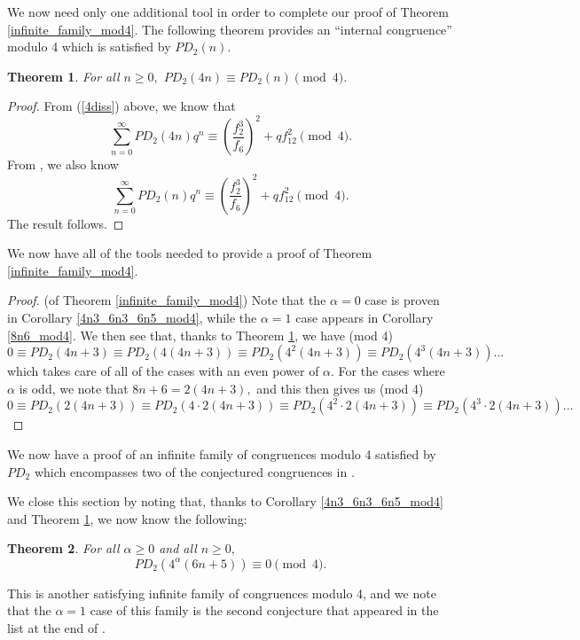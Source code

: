 \documentclass{amsart}
\newtheorem{theorem}{Theorem}[section]
\begin{document}
We now need only one additional tool in order to complete our proof of Theorem \ref{infinite_family_mod4}.  The following theorem provides an ``internal congruence'' modulo 4 which is satisfied by $PD_2(n)$.  

\begin{theorem}
\label{internal_cong_mod4}
For all $n\geq 0,$ $PD_2(4n) \equiv PD_2(n) \pmod{4}.$
\end{theorem}
\begin{proof}
From (\ref{4diss}) above, we know that 
$$\sum_{n=0}^\infty PD_2(4n)q^n \equiv  \left(\frac{f_2^3}{f_6}\right)^2 +qf_{12}^2 \pmod{4}.$$  
From \cite[Lemma 4]{Her}, we also know 
$$\sum_{n=0}^\infty PD_2(n)q^n \equiv  \left(\frac{f_2^3}{f_6}\right)^2 +qf_{12}^2 \pmod{4}.$$  The result follows.  
\end{proof}

We now have all of the tools needed to provide a proof of Theorem \ref{infinite_family_mod4}.  
\begin{proof}
(of Theorem \ref{infinite_family_mod4})  Note that the $\alpha=0$ case is proven in Corollary \ref{4n3_6n3_6n5_mod4}, while the $\alpha = 1$ case appears in Corollary \ref{8n6_mod4}.   We then see that, thanks to Theorem \ref{internal_cong_mod4}, we have (mod 4)
$$
0 \equiv PD_2(4n+3) \equiv PD_2(4(4n+3)) \equiv PD_2(4^2(4n+3)) \equiv PD_2(4^3(4n+3)) \dots
$$
which takes care of all of the cases with an even power of $\alpha.$  For the cases where $\alpha$ is odd, we note that  $8n+6 = 2(4n+3),$ and this then gives us (mod 4) 
$$
0 \equiv PD_2(2(4n+3)) \equiv PD_2(4\cdot 2(4n+3)) \equiv PD_2(4^2\cdot 2(4n+3)) \equiv  PD_2(4^3\cdot 2(4n+3)) \dots
$$
\end{proof}
We now have a proof of an infinite family of congruences modulo 4 satisfied by $PD_2$ which encompasses two of the conjectured congruences in \cite{Her}.  

We close this section by noting that, thanks to Corollary \ref{4n3_6n3_6n5_mod4} and Theorem \ref{internal_cong_mod4}, we now know the following:  
\begin{theorem}
\label{infinite_family_mod4_6n5}
For all $\alpha \geq 0$ and all $n\geq 0,$
$$PD_2(4^\alpha(6n+5)) \equiv 0 \pmod{4}.$$
\end{theorem}
This is another satisfying infinite family of congruences modulo 4, and we note that the $\alpha=1$ case of this family is the second conjecture that appeared in the list at the end of \cite{Her}.  
\end{document}
